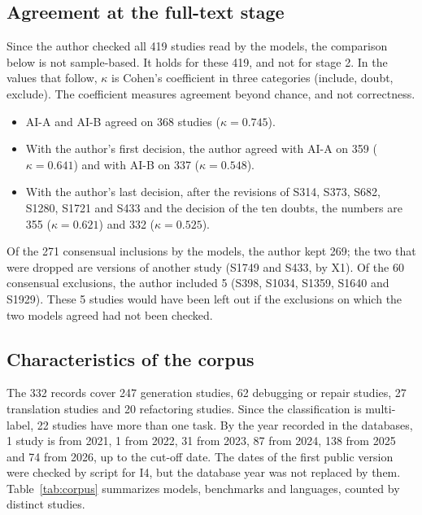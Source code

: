 \subsection{Agreement at the full-text stage}
Since the author checked all 419 studies read by the models, the comparison below is not sample-based. It holds for
these 419, and not for stage 2. In the values that follow, $\kappa$ is Cohen's
coefficient in three categories (include, doubt, exclude). The coefficient measures agreement beyond chance, and not correctness.
\begin{itemize}
  \item AI-A and AI-B agreed on 368 studies ($\kappa = 0.745$).
  \item With the author's first decision, the author agreed with AI-A on 359 ($\kappa = 0.641$) and with AI-B on 337
  ($\kappa = 0.548$).
  \item With the author's last decision, after the revisions of S314, S373, S682, S1280, S1721 and S433
  and the decision of the ten doubts, the numbers are 355 ($\kappa = 0.621$) and 332 ($\kappa = 0.525$).
\end{itemize}
Of the 271 consensual inclusions by the models, the author kept 269; the two that were dropped are versions of another study
(S1749 and S433, by X1). Of the 60 consensual exclusions, the author included 5 (S398, S1034, S1359, S1640 and S1929). These
5 studies would have been left out if the exclusions on which the two models agreed
had not been checked.

\subsection{Characteristics of the corpus}\label{sec:corpus}
The 332 records cover 247 generation studies, 62 debugging or repair studies, 27 translation studies and 20 refactoring studies. Since the
classification is multi-label, 22 studies have more than one task. By the year recorded in the databases, 1 study is from 2021,
1 from 2022, 31 from 2023, 87 from 2024, 138 from 2025 and 74 from 2026, up to the cut-off date. The dates of the first public
version were checked by script for I4, but the database year was not replaced by them.
Table~\ref{tab:corpus} summarizes models, benchmarks and languages, counted by distinct studies.

